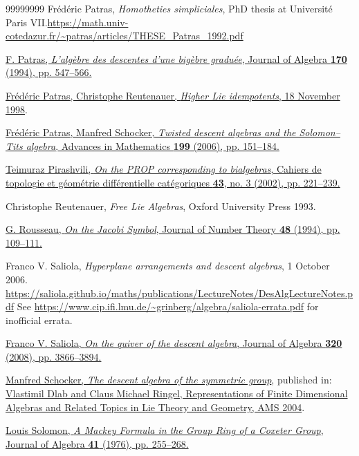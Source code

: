 \documentclass[numbers=enddot,12pt,final,onecolumn,notitlepage]{scrartcl}%
\theoremstyle{definition}
\begin{document}
\begin{thebibliography}{99999999}
Fr\'{e}d\'{e}ric Patras, \textit{Homotheties
simpliciales}, PhD thesis at Universit\'{e} Paris VII.\newline\url{https://math.univ-cotedazur.fr/~patras/articles/THESE_Patras_1992.pdf}

\href{https://doi.org/10.1006/jabr.1994.1352}{F.
Patras, \textit{L'alg\`{e}bre des descentes d'une big\`{e}bre gradu\'{e}e},
Journal of Algebra \textbf{170} (1994), pp. 547--566.}

%
\href{https://citeseerx.ist.psu.edu/viewdoc/summary?doi=10.1.1.25.1416}{Fr\'{e}d\'{e}ric
Patras, Christophe Reutenauer, \textit{Higher Lie idempotents}, 18 November
1998}.

%
\href{https://doi.org/10.1016/j.aim.2005.01.010}{Fr\'{e}d\'{e}ric Patras,
Manfred Schocker, \textit{Twisted descent algebras and the Solomon--Tits
algebra}, Advances in Mathematics \textbf{199} (2006), pp. 151--184.}

%
\href{http://www.numdam.org/item/CTGDC_2002__43_3_221_0/}{Teimuraz Pirashvili,
\textit{On the PROP corresponding to bialgebras}, Cahiers de topologie et
g\'{e}om\'{e}trie diff\'{e}rentielle cat\'{e}goriques \textbf{43}, no. 3
(2002), pp. 221--239.}

Christophe Reutenauer, \textit{Free Lie Algebras},
Oxford University Press 1993.

\href{https://doi.org/10.1006/jnth.1994.1057}{G.
Rousseau, \textit{On the Jacobi Symbol}, Journal of Number Theory \textbf{48}
(1994), pp. 109--111.}

Franco V. Saliola, \textit{Hyperplane arrangements
and descent algebras}, 1 October 2006.\newline%
\url{https://saliola.github.io/maths/publications/LectureNotes/DesAlgLectureNotes.pdf}\newline
See \url{https://www.cip.ifi.lmu.de/~grinberg/algebra/saliola-errata.pdf} for
inofficial errata.

%
\href{https://doi.org/10.1016/j.jalgebra.2008.07.009}{Franco V. Saliola,
\textit{On the quiver of the descent algebra}, Journal of Algebra \textbf{320}
(2008), pp. 3866--3894.}

%
\href{http://libgen.rs/book/index.php?md5=42AD6BC7CD5319CA7009CCFFF1C29E63}{Manfred
Schocker, \textit{The descent algebra of the symmetric group}}, published in:
\href{http://www.ams.org/books/fic/040/}{Vlastimil Dlab and Claus Michael
Ringel, Representations of Finite Dimensional Algebras and Related Topics in
Lie Theory and Geometry, AMS 2004}.

%
\href{https://doi.org/10.1016/0021-8693(76)90182-4}{Louis Solomon, \textit{A
Mackey Formula in the Group Ring of a Coxeter Group}, Journal of Algebra
\textbf{41} (1976), pp. 255--268.}
\end{thebibliography}
\end{document}
